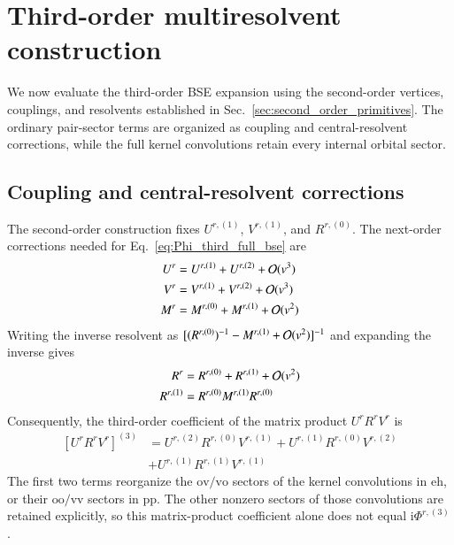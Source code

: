 \documentclass[aip,jcp,reprint,noshowkeys,superscriptaddress]{revtex4-1}
\newcommand{\ii}{\mathrm{i}}
\newcommand{\eh}{\text{eh}}
\newcommand{\pp}{\text{pp}}
\begin{document}
\section{Third-order multiresolvent construction}
\label{sec:third_order_multiresolvent}

We now evaluate the third-order BSE expansion using the second-order
vertices, couplings, and resolvents established in
Sec.~\ref{sec:second_order_primitives}. The ordinary pair-sector terms
are organized as coupling and central-resolvent corrections, while the
full kernel convolutions retain every internal orbital sector.

\subsection{Coupling and central-resolvent corrections}

The second-order construction fixes $U^{r,(1)}$, $V^{r,(1)}$, and
$R^{r,(0)}$. The next-order corrections needed for
Eq.~\eqref{eq:Phi_third_full_bse} are
\begin{align}
    U^r&=U^{r,(1)}+U^{r,(2)}+\order*{v^3}
    \\
    V^r&=V^{r,(1)}+V^{r,(2)}+\order*{v^3}
    \label{eq:target_UV_expansion}
    \\
    M^r&=M^{r,(0)}+M^{r,(1)}+\order*{v^2}
    \label{eq:target_M_expansion}
\end{align}
Writing the inverse resolvent as
$[(R^{r,(0)})^{-1}-M^{r,(1)}+\order*{v^2}]^{-1}$
and expanding the inverse gives
\begin{align}
    R^r&=R^{r,(0)}+R^{r,(1)}+\order*{v^2}
    \\
    R^{r,(1)}&=R^{r,(0)}M^{r,(1)}R^{r,(0)}
    \label{eq:target_R_first}
\end{align}
Consequently, the third-order coefficient of the matrix product $U^rR^rV^r$
is
\begin{equation}
\begin{split}
    [U^rR^rV^r]^{(3)}
    &=U^{r,(2)}R^{r,(0)}V^{r,(1)}
    +U^{r,(1)}R^{r,(0)}V^{r,(2)}
    \\
    &+U^{r,(1)}R^{r,(1)}V^{r,(1)}
    \label{eq:target_third_order}
\end{split}
\end{equation}
The first two terms reorganize the $\text{ov}/\text{vo}$ sectors of
the kernel convolutions in $\eh$, or their $\text{oo}/\text{vv}$
sectors in $\pp$. The other nonzero sectors of those convolutions are
retained explicitly, so this matrix-product coefficient alone does not
equal $\ii\Phi^{r,(3)}$.
\end{document}
